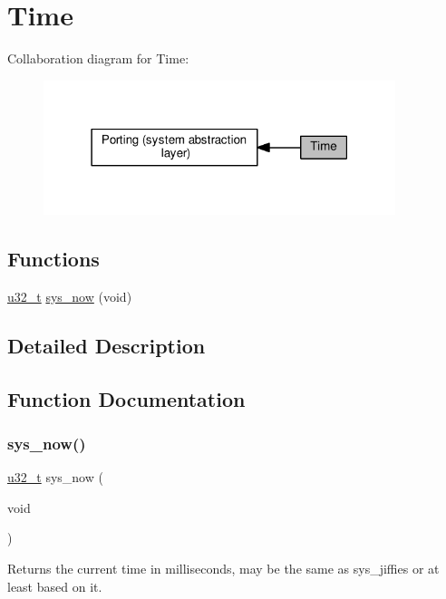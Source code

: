 \hypertarget{group__sys__time}{}\section{Time}
\label{group__sys__time}
Collaboration diagram for Time\+:
\nopagebreak
\begin{figure}[H]
\begin{center}
\leavevmode
\includegraphics[width=291pt]{group__sys__time}
\end{center}
\end{figure}
\subsection*{Functions}
\begin{DoxyCompactItemize}
\item 
\hyperlink{group__compiler__abstraction_ga4c14294869aceba3ef9d4c0c302d0f33}{u32\+\_\+t} \hyperlink{group__sys__time_ga11316ac1e77418c6fa4ab8869e3fa199}{sys\+\_\+now} (void)
\end{DoxyCompactItemize}


\subsection{Detailed Description}


\subsection{Function Documentation}
\mbox{\label{group__sys__time_ga11316ac1e77418c6fa4ab8869e3fa199}} 
\subsubsection{\texorpdfstring{sys\+\_\+now()}{sys\_now()}}
{\footnotesize\ttfamily \hyperlink{group__compiler__abstraction_ga4c14294869aceba3ef9d4c0c302d0f33}{u32\+\_\+t} sys\+\_\+now (\begin{DoxyParamCaption}\item[{void}]{ }\end{DoxyParamCaption})}

Returns the current time in milliseconds, may be the same as sys\+\_\+jiffies or at least based on it. 